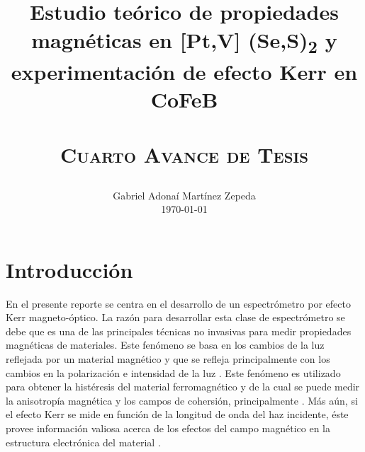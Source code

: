 \documentclass[paper=letter, fontsize=12pt]{scrartcl}
\title{
	\usefont{OT1}{bch}{b}{n}
	
	\horrule{0.5pt} \\[0.4cm]
	\large Estudio te\'orico de propiedades magn\'eticas en [Pt,V] (Se,S)\textsubscript{2} y experimentación de efecto Kerr en CoFeB  \\
	\horrule{2pt} \\[0.2cm]
	\normalfont \normalsize \textsc{Cuarto Avance de Tesis} \\ [5pt]
}
\author{
	\normalfont 								\normalsize
	Gabriel Adona\'i Mart\'inez Zepeda \\[-1pt]		\normalsize
	\today
}
\date{}
\numberwithin{equation}{section}		%
\numberwithin{figure}{section}			%
\numberwithin{table}{section}				%
\begin{document}
	\maketitle
	\section{Introducci\'on}
	En el presente reporte se centra  en el desarrollo de un espectr\'ometro por efecto Kerr  magneto-\'optico. La raz\'on para desarrollar esta clase de espectr\'ometro se debe  que es una de las principales t\'ecnicas no invasivas para medir propiedades magn\'eticas de materiales. Este fen\'omeno se basa en  los cambios de la luz reflejada por un material magn\'etico y que se refleja principalmente con los cambios en la polarizaci\'on e intensidad de la luz \cite{MOp-1997}. Este fenómeno es utilizado para obtener la hist\'eresis del material ferromagn\'etico y de la cual se puede medir la anisotrop\'ia magn\'etica y los campos de cohersi\'on, principalmente \cite{MOp-2008}. M\'as a\'un, si el efecto Kerr se mide en funci\'on de la longitud de onda del haz incidente, \'este provee informaci\'on valiosa acerca de los efectos del campo  magn\'etico en la estructura electr\'onica del material \cite{MOp-1997}.
	
\end{document}
